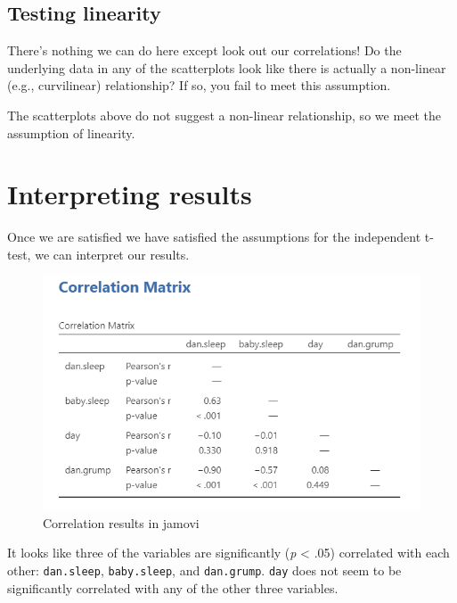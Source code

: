 \documentclass[
]{book}
\begin{document}
\hypertarget{testing-linearity}{%
\subsection{Testing linearity}\label{testing-linearity}}

There's nothing we can do here except look out our correlations! Do the underlying data in any of the scatterplots look like there is actually a non-linear (e.g., curvilinear) relationship? If so, you fail to meet this assumption.

The scatterplots above do not suggest a non-linear relationship, so we meet the assumption of linearity.

\hypertarget{interpreting-results-4}{%
\section{Interpreting results}\label{interpreting-results-4}}

Once we are satisfied we have satisfied the assumptions for the independent t-test, we can interpret our results.

\begin{figure}

{\centering \includegraphics[width=1\linewidth]{images/08-correlation/correlation-matrix} 

}

\caption{Correlation results in jamovi}\label{fig:unnamed-chunk-9}
\end{figure}

It looks like three of the variables are significantly (\emph{p} \textless{} .05) correlated with each other: \texttt{dan.sleep}, \texttt{baby.sleep}, and \texttt{dan.grump}. \texttt{day} does not seem to be significantly correlated with any of the other three variables.
\end{document}
